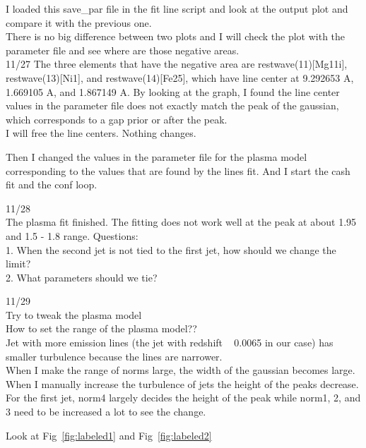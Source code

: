 I loaded this save\_par file in the fit line script and look at the output plot and compare it with the previous one.\\
There is no big difference between two plots and I will check the plot with the parameter file and see where are those negative areas.\\

11/27
The three elements that have the negative area are restwave(11)[Mg11i], restwave(13)[Ni1], and restwave(14)[Fe25], which have line center at 9.292653 A, 1.669105 A, and 1.867149 A. By looking at the graph, I found the line center values in the parameter file does not exactly match the peak of the gaussian, which corresponds to a gap prior or after the peak.\\
I will free the line centers. Nothing changes.

Then I changed the values in the parameter file for the plasma model corresponding to the values that are found by the lines fit. And I start the cash fit and the conf loop.

11/28\\
The plasma fit finished. The fitting does not work well at the peak at about 1.95 and 1.5 - 1.8 range. 
Questions:\\
1. When the second jet is not tied to the first jet, how should we change the limit?\\
2. What parameters should we tie? 



11/29\\
Try to tweak the plasma model\\ 
How to set the range of the plasma model??\\

Jet with more emission lines (the jet with redshift ~ 0.0065 in our case) has smaller turbulence because the lines are narrower.\\

When I make the range of norms large, the width of the gaussian becomes large. 
When I manually increase the turbulence of jets the height of the peaks decrease. 
For the first jet, norm4 largely decides the height of the peak while norm1, 2, and 3 need to be increased a lot to see the change. 

 Look at Fig~\ref{fig:labeled1} and Fig~\ref{fig:labeled2}
 
